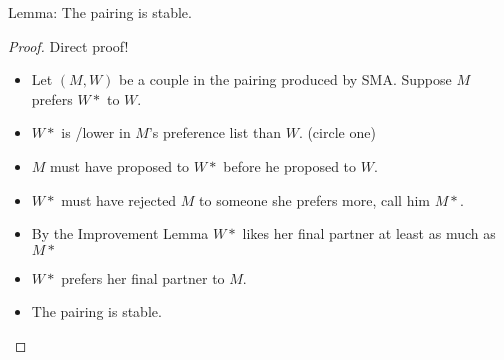 \question Lemma: The pairing is stable.   \newline

\begin{solution}[3 in]
\begin{proof}  Direct proof!
\begin{itemize}
\item[] Let $(M, W)$ be a couple in the pairing produced by SMA. 
Suppose $M$ prefers $W*$ to $W$.
\item[] $W*$ is \underline{}/lower in $M$’s preference 
list than $W$. (circle one)
\item[] $M$ must have proposed to $W*$ before he proposed to $W$.
\item[]  $W*$ must have rejected $M$ to someone she prefers more, 
call him $M*$.
\item[] By the Improvement Lemma $W*$ likes her final partner at 
least as much as $M*$
\item[] $W*$ prefers her final partner to $M$.
\item[] The pairing is stable.
\end{itemize}
\end{proof}
\end{solution}
